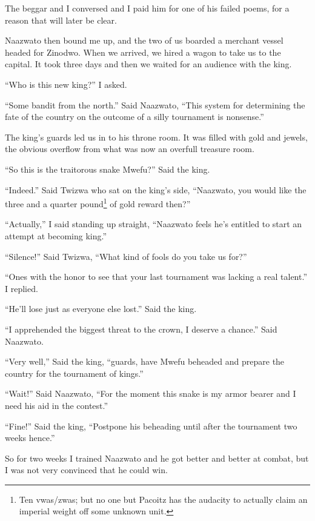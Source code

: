 The beggar and I conversed and I paid him for one of his failed poems, for a reason that will later be clear.

Naazwato then bound me up, and the two of us boarded a merchant vessel headed for Zinodwo.
When we arrived, we hired a wagon to take us to the capital. It took three days and then we waited for an audience with the king.

``Who is this new king?'' I asked.

``Some bandit from the north.'' Said Naazwato, ``This system for determining the fate of the country on the outcome of a silly tournament is nonsense.''

The king's guards led us in to his throne room. It was filled with gold and jewels, the obvious overflow from what was now an overfull treasure room.

``So this is the traitorous snake Mwefu?'' Said the king.

``Indeed.'' Said Twizwa who sat on the king's side, ``Naazwato, you would like the three and a quarter pound\footnote{Ten vwas/zwas; but no one but Pacoitz has the audacity to actually claim an imperial weight off some unknown unit.} of gold reward then?''

``Actually,'' I said standing up straight, ``Naazwato feels he's entitled to start an attempt at becoming king.''

``Silence!'' Said Twizwa, ``What kind of fools do you take us for?''

``Ones with the honor to see that your last tournament was lacking a real talent.'' I replied.

``He'll lose just as everyone else lost.'' Said the king.

``I apprehended the biggest threat to the crown, I deserve a chance.'' Said Naazwato.

``Very well,'' Said the king, ``guards, have Mwefu beheaded and prepare the country for the tournament of kings.''

``Wait!'' Said Naazwato, ``For the moment this snake is my armor bearer and I need his aid in the contest.''

``Fine!'' Said the king, ``Postpone his beheading until after the tournament two weeks hence.''

So for two weeks I trained Naazwato and he got better and better at combat, but I was not very convinced that he could win.
